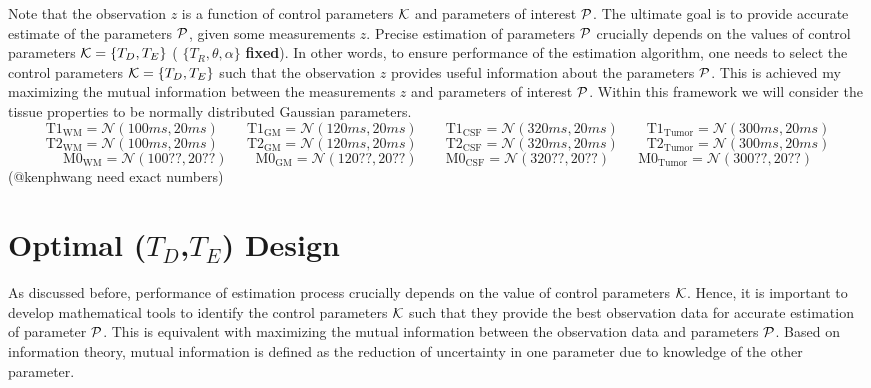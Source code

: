 \documentclass{article}         %
\theoremstyle{definition}
\theoremstyle{remark}
\begin{document}
Note that the observation $z$ is a function of control parameters $\mathcal{K}$ and
parameters of interest $\mathcal{P}$.  The ultimate goal is to provide accurate estimate
of the parameters $\mathcal{P}$, given some measurements $z$. 
Precise estimation of parameters $\mathcal{P}$ crucially depends on the values of
control parameters $\mathcal{K}=\{T_D,T_E\}$ ( $\{T_R,\theta,\alpha\}$ \textbf{fixed}).  
In other words, to ensure
performance of the estimation algorithm, one needs to select the control
parameters $\mathcal{K}=\{T_D,T_E\}$ such that the observation $z$ provides
useful information about the parameters $\mathcal{P}$. This is achieved my maximizing
the mutual information between the measurements $z$ and parameters of interest
$\mathcal{P}$.  Within this framework we will consider the tissue properties to be
normally distributed Gaussian parameters.
\[
  \text{T1}_\text{WM}    =  \mathcal{N}(100ms, 20ms)  \qquad
  \text{T1}_\text{GM}    =  \mathcal{N}(120ms, 20ms)  \qquad
  \text{T1}_\text{CSF}   =  \mathcal{N}(320ms, 20ms)  \qquad
  \text{T1}_\text{Tumor} =  \mathcal{N}(300ms, 20ms)
\]
\[
  \text{T2}_\text{WM}    =  \mathcal{N}(100ms, 20ms)  \qquad
  \text{T2}_\text{GM}    =  \mathcal{N}(120ms, 20ms)  \qquad
  \text{T2}_\text{CSF}   =  \mathcal{N}(320ms, 20ms)  \qquad
  \text{T2}_\text{Tumor} =  \mathcal{N}(300ms, 20ms)
\]
\[
  \text{M0}_\text{WM}    =  \mathcal{N}(100??, 20??)  \qquad
  \text{M0}_\text{GM}    =  \mathcal{N}(120??, 20??)  \qquad
  \text{M0}_\text{CSF}   =  \mathcal{N}(320??, 20??)  \qquad
  \text{M0}_\text{Tumor} =  \mathcal{N}(300??, 20??)
\]
{\color{red}(@kenphwang need exact numbers)}


\section{Optimal ($T_D$,$T_E$) Design}\label{oed}
As discussed before, performance of estimation process crucially depends on the
value of control parameters $\mathcal{K}$. Hence, it is important to develop
mathematical tools to identify the control parameters $\mathcal{K}$ such that they
provide the best observation data for accurate estimation of parameter $\mathcal{P}$.
This is equivalent with maximizing the mutual information between the
observation data and parameters $\mathcal{P}$. Based on information theory, mutual
information is defined as the reduction of uncertainty in one parameter due to
knowledge of the other parameter.
\end{document}
